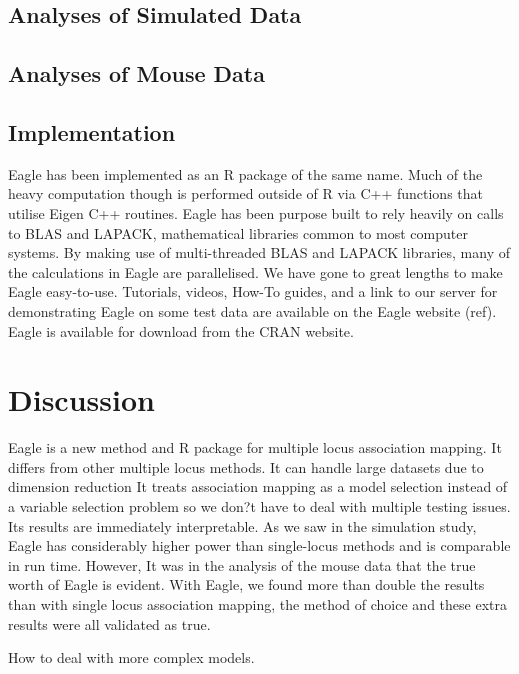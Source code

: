 \documentclass{nature}
\begin{document}
\subsection{Analyses of Simulated Data}

\subsection{Analyses of Mouse Data}




\subsection{Implementation}

Eagle has been implemented as an R package of the same name. Much of the heavy computation though is performed outside of R 
via C++ functions that utilise Eigen C++ routines. Eagle has been purpose built to rely heavily on calls to BLAS and LAPACK, 
mathematical libraries common to most computer systems. By making use of multi-threaded  BLAS and LAPACK libraries, many of the 
calculations in Eagle are parallelised. We have gone to great lengths to make Eagle easy-to-use. Tutorials, videos, How-To guides, and 
a link to our server for demonstrating Eagle on some test data are available on the Eagle website (ref).  
Eagle is available for download from the CRAN website. 

  
  
\section{Discussion}


Eagle is a new method and R package for multiple locus association mapping. It differs from other multiple locus methods. It can handle large datasets due to dimension reduction It treats association mapping as a model selection instead of a variable selection problem so we don?t have to deal with multiple testing issues. Its results are immediately interpretable. As we saw in the simulation study, Eagle has considerably higher power than single-locus methods and is comparable in run time. However, It was in the analysis of the mouse data that the true worth of Eagle is evident. With Eagle, we found more than double the results than with single locus association mapping, the method of choice and these extra results were all validated as true.



How to deal with more complex models. 
\end{document}
